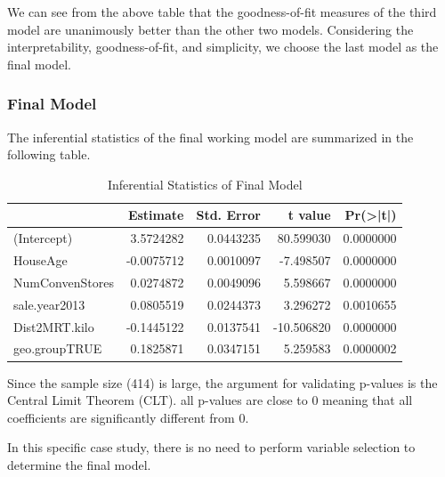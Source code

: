 \documentclass[
]{book}
\newenvironment{Shaded}{\begin{snugshade}}{\end{snugshade}}
\newcommand{\AttributeTok}[1]{\textcolor[rgb]{0.13,0.29,0.53}{#1}}
\newcommand{\FunctionTok}[1]{\textcolor[rgb]{0.13,0.29,0.53}{\textbf{#1}}}
\newcommand{\NormalTok}[1]{#1}
\newcommand{\SpecialCharTok}[1]{\textcolor[rgb]{0.81,0.36,0.00}{\textbf{#1}}}
\newcommand{\StringTok}[1]{\textcolor[rgb]{0.31,0.60,0.02}{#1}}
\begin{document}
We can see from the above table that the goodness-of-fit measures of the third model are unanimously better than the other two models. Considering the interpretability, goodness-of-fit, and simplicity, we choose the last model as the final model.

\hypertarget{final-model}{%
\subsubsection{Final Model}\label{final-model}}

The inferential statistics of the final working model are summarized in the following table.

\begin{Shaded}
\end{Shaded}

\begin{table}

\caption{\label{tab:unnamed-chunk-90}Inferential Statistics of Final Model}
\centering
\begin{tabular}[t]{l|r|r|r|r}
\hline
  & Estimate & Std. Error & t value & Pr(>|t|)\\
\hline
(Intercept) & 3.5724282 & 0.0443235 & 80.599030 & 0.0000000\\
\hline
HouseAge & -0.0075712 & 0.0010097 & -7.498507 & 0.0000000\\
\hline
NumConvenStores & 0.0274872 & 0.0049096 & 5.598667 & 0.0000000\\
\hline
sale.year2013 & 0.0805519 & 0.0244373 & 3.296272 & 0.0010655\\
\hline
Dist2MRT.kilo & -0.1445122 & 0.0137541 & -10.506820 & 0.0000000\\
\hline
geo.groupTRUE & 0.1825871 & 0.0347151 & 5.259583 & 0.0000002\\
\hline
\end{tabular}
\end{table}

Since the sample size (414) is large, the argument for validating p-values is the Central Limit Theorem (CLT). all p-values are close to 0 meaning that all coefficients are significantly different from 0.

In this specific case study, there is no need to perform variable selection to determine the final model.
\end{document}
